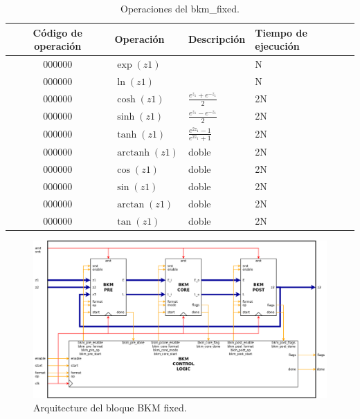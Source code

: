 \documentclass[10pt,a4paper]{book}
\DeclareMathOperator\arctanh{arctanh}
\begin{document}
      \begin{table}[h]
      \centering
      \begin{tabular}{clll}
         \hline
         Código de operación  &  Operación      &  Descripci\'on                 &  Tiempo de ejecuci\'on          \\ \hline \hline
         000000               &  $\exp(z1)$     &                                &  N                              \\ \hline
         000000               &  $\ln(z1)$      &                                &  N                              \\ \hline
         000000               &  $\cosh(z1)$    &  $\frac{e^{z_1}+e^{-z_1}}{2}$  &  2N                             \\ \hline
         000000               &  $\sinh(z1)$    &  $\frac{e^{z_1}-e^{-z_1}}{2}$  &  2N                             \\ \hline
         000000               &  $\tanh(z1)$    &  $\frac{e^{2z_1}-1}{e^{2z_1}+1}$  &  2N                             \\ \hline
         000000               &  $\arctanh(z1)$ &  doble                         &  2N                             \\ \hline
         000000               &  $\cos(z1)$     &  doble                         &  2N                             \\ \hline
         000000               &  $\sin(z1)$     &  doble                         &  2N                             \\ \hline
         000000               &  $\arctan(z1)$  &  doble                         &  2N                             \\ \hline
         000000               &  $\tan(z1)$     &  doble                         &  2N                             \\ \hline
      \end{tabular}
      \caption{Operaciones del bkm\_fixed.}
      \label{tab:bkm_fixed_operations}
      \end{table}

      \begin{figure}[h]
         \centering
         \includegraphics[width=1.0\textwidth]{./figures/bkm_fixed.png}
         \caption{Arquitecture del bloque BKM fixed.}
         \label{fig:bkm_fixed}
      \end{figure}
\end{document}
